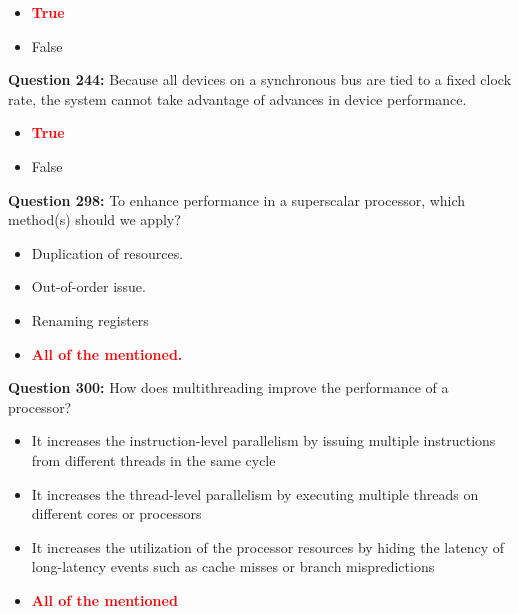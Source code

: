 \documentclass[12pt,a4paper]{article}
\begin{document}
\begin{itemize}
    \item[\textbf{A.}] \textcolor{red}{\textbf{True}}
    \item[\textbf{B.}] False
\end{itemize}

\vspace{0.5cm}

\textbf{Question 244:} Because all devices on a synchronous bus are tied to a fixed clock rate, the system cannot take advantage of advances in device performance.

\begin{itemize}
    \item[\textbf{A.}] \textcolor{red}{\textbf{True}}
    \item[\textbf{B.}] False
\end{itemize}

\vspace{0.5cm}

\textbf{Question 298:} To enhance performance in a superscalar processor, which method(s) should we apply?

\begin{itemize}
    \item[\textbf{A.}] Duplication of resources.
    \item[\textbf{B.}] Out-of-order issue.
    \item[\textbf{C.}] Renaming registers
    \item[\textbf{D.}] \textcolor{red}{\textbf{All of the mentioned.}}
\end{itemize}

\vspace{0.5cm}

\textbf{Question 300:} How does multithreading improve the performance of a processor?

\begin{itemize}
    \item[\textbf{A.}] It increases the instruction-level parallelism by issuing multiple instructions from different threads in the same cycle
    \item[\textbf{B.}] It increases the thread-level parallelism by executing multiple threads on different cores or processors
    \item[\textbf{C.}] It increases the utilization of the processor resources by hiding the latency of long-latency events such as cache misses or branch mispredictions
    \item[\textbf{D.}] \textcolor{red}{\textbf{All of the mentioned}}
\end{itemize}
\end{document}
